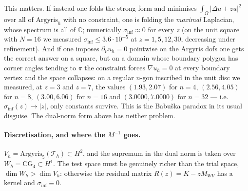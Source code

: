 \documentclass[11pt,a4paper]{article}
\newcommand{\C}{\mathbb{C}}
\newcommand{\siginf}{\sigma_{\inf}}
\begin{document}
This matters. If instead one folds the strong form and minimises
$\int_\Omega |\Delta u + zu|^2$ over all of $\mathrm{Argyris}_h$ with no
constraint, one is folding the \emph{maximal} Laplacian, whose spectrum is all
of $\C$; numerically $\siginf \approx 0$ for every $z$ (on the unit square with
$N=16$ we measured $\siginf \le 3.6\cdot 10^{-5}$ at $z = 1, 5, 12, 30$,
decreasing under refinement). And if one
imposes $\partial_\nu u_h = 0$ pointwise on the Argyris dofs one gets the correct
answer on a square, but on a domain whose boundary polygon has corner angles
tending to $\pi$ the constraint forces $\nabla u_h = 0$ at every boundary
vertex and the space collapses: on a regular $n$-gon inscribed in the unit
disc we measured, at $z = 3$ and $z = 7$, the values
$(1.93, 2.07)$ for $n = 4$, $(2.56, 4.05)$ for $n = 8$, $(3.00, 6.06)$ for
$n = 16$ and $(3.0000, 7.0000)$ for $n = 32$ --- i.e.\ $\siginf(z) \to |z|$,
only constants survive. This is the
Babu\v{s}ka paradox in its usual disguise. The dual-norm form above has neither
problem.

\paragraph{Discretisation, and where the $M^{-1}$ goes.} $V_h =
\mathrm{Argyris}_5(\mathcal{T}_h) \subset H^2$, and the supremum in the dual norm
is taken over $W_h = \mathrm{CG}_4 \subset H^1$. The test space must be genuinely
richer than the trial space, $\dim W_h > \dim V_h$: otherwise the residual matrix
$R(z) = K - zM_{WV}$ has a kernel and $\siginf \equiv 0$.
\end{document}
